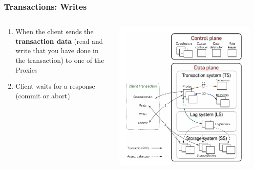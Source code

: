 \begin{frame}
    \frametitle{Transactions: Writes}
    \begin{columns}
        \begin{column}{0.5\textwidth}
            \begin{enumerate}
                \item When the client sends the \textbf{transaction data} (read and write that you have done in the transaction) to one of the Proxies
                \item Client waits for a response (commit or abort)
            \end{enumerate}
        \end{column}
        \begin{column}{0.5\textwidth}
            \centering
            \includegraphics[width=\textwidth]{img/2-Architecture/Architecture and transaction processing.png}
        \end{column}
    \end{columns}
\end{frame}


